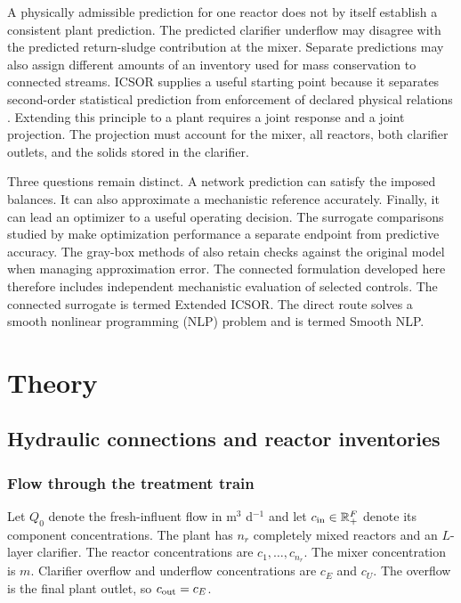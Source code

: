 A physically admissible prediction for one reactor does not by itself establish a consistent plant prediction. The predicted clarifier underflow may disagree with the predicted return-sludge contribution at the mixer. Separate predictions may also assign different amounts of an inventory used for mass conservation to connected streams. ICSOR supplies a useful starting point because it separates second-order statistical prediction from enforcement of declared physical relations \citep{Selerio2026}. Extending this principle to a plant requires a joint response and a joint projection. The projection must account for the mixer, all reactors, both clarifier outlets, and the solids stored in the clarifier.

Three questions remain distinct. A network prediction can satisfy the imposed balances. It can also approximate a mechanistic reference accurately. Finally, it can lead an optimizer to a useful operating decision. The surrogate comparisons studied by \citet{Pedrozo2025} make optimization performance a separate endpoint from predictive accuracy. The gray-box methods of \citet{Hameed2026} also retain checks against the original model when managing approximation error. The connected formulation developed here therefore includes independent mechanistic evaluation of selected controls. The connected surrogate is termed Extended ICSOR. The direct route solves a smooth nonlinear programming (NLP) problem and is termed Smooth NLP.

\section{Theory}

\subsection{Hydraulic connections and reactor inventories}

\subsubsection{Flow through the treatment train}

Let $Q_0$ denote the fresh-influent flow in m$^3$ d$^{-1}$ and let $c_{\rm in}\in\mathbb R_+^F$ denote its component concentrations. The plant has $n_r$ completely mixed reactors and an $L$-layer clarifier. The reactor concentrations are $c_1,\ldots,c_{n_r}$. The mixer concentration is $m$. Clarifier overflow and underflow concentrations are $c_E$ and $c_U$. The overflow is the final plant outlet, so $c_{\rm out}=c_E$.

